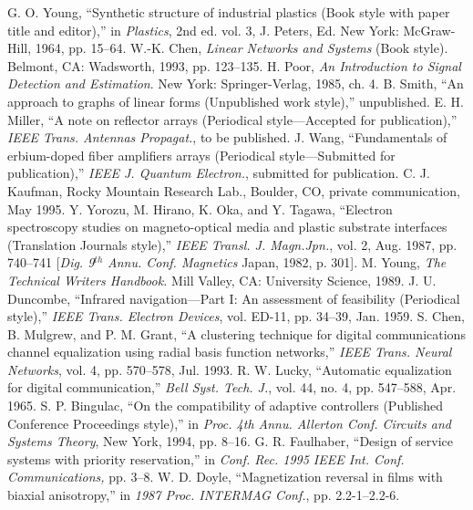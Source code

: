\documentclass[transmag]{IEEEtran}
\begin{document}
\begin{thebibliography}{00}
 G. O. Young, ``Synthetic structure of industrial plastics (Book style with paper title and editor),'' in \emph{Plastics}, 2nd ed. vol. 3, J. Peters, Ed. New York: McGraw-Hill, 1964, pp. 15--64.
 W.-K. Chen, \emph{Linear Networks and Systems} (Book style)$. $Belmont, CA: Wadsworth, 1993, pp. 123--135.
 H. Poor, \emph{An Introduction to Signal Detection and Estimation}. New York: Springer-Verlag, 1985, ch. 4.
 B. Smith, ``An approach to graphs of linear forms (Unpublished work style),'' unpublished.
 E. H. Miller, ``A note on reflector arrays (Periodical style---Accepted for publication),'' \emph{IEEE Trans. Antennas Propagat.}, to be published.
 J. Wang, ``Fundamentals of erbium-doped fiber amplifiers arrays (Periodical style---Submitted for publication),'' \emph{IEEE J. Quantum Electron.}, submitted for publication.
 C. J. Kaufman, Rocky Mountain Research Lab., Boulder, CO, private communication, May 1995.
 Y. Yorozu, M. Hirano, K. Oka, and Y. Tagawa, ``Electron spectroscopy studies on magneto-optical media and plastic substrate interfaces (Translation Journals style),'' \emph{IEEE Transl. J. Magn.Jpn.}, vol. 2, Aug. 1987, pp. 740--741 [\emph{Dig. 9}$^{th}$\emph{ Annu. Conf. Magnetics} Japan, 1982, p. 301].
 M. Young, \emph{The Technical Writers Handbook.} Mill Valley, CA: University Science, 1989.
 J. U. Duncombe, ``Infrared navigation---Part I: An assessment of feasibility (Periodical style),'' \emph{IEEE Trans. Electron Devices}, vol. ED-11, pp. 34--39, Jan. 1959.
 S. Chen, B. Mulgrew, and P. M. Grant, ``A clustering technique for digital communications channel equalization using radial basis function networks,'' \emph{IEEE Trans. Neural Networks}, vol. 4, pp. 570--578, Jul. 1993.
 R. W. Lucky, ``Automatic equalization for digital communication,'' \emph{Bell Syst. Tech. J.}, vol. 44, no. 4, pp. 547--588, Apr. 1965.
 S. P. Bingulac, ``On the compatibility of adaptive controllers (Published Conference Proceedings style),'' in \emph{Proc. 4th Annu. Allerton Conf. Circuits and Systems Theory}, New York, 1994, pp. 8--16.
 G. R. Faulhaber, ``Design of service systems with priority reservation,'' in \emph{Conf. Rec. 1995 IEEE Int. Conf. Communications,} pp. 3--8.
 W. D. Doyle, ``Magnetization reversal in films with biaxial anisotropy,'' in \emph{1987 Proc. INTERMAG Conf.}, pp. 2.2-1--2.2-6.

\end{thebibliography}
\end{document}
